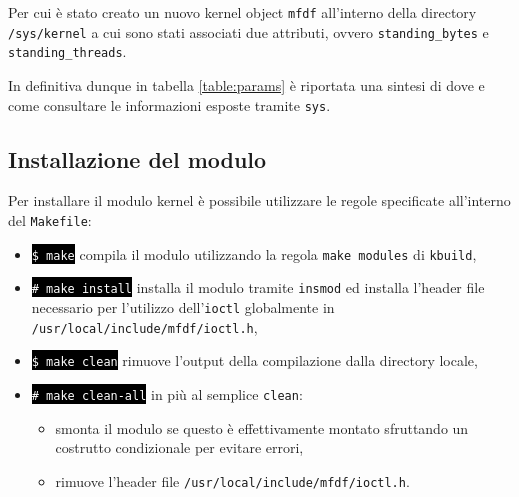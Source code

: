 \documentclass{article}
\newcommand{\terminal}[1]{\colorbox{black}{\textcolor{white}{\texttt{#1}}}}
\begin{document}
Per cui è stato creato un nuovo kernel object \texttt{mfdf} all'interno della directory \texttt{/sys/kernel} a cui sono stati associati due attributi, ovvero \texttt{standing\_bytes} e \texttt{standing\_threads}.

In definitiva dunque in tabella \ref{table:params} è riportata una sintesi di dove e come consultare le informazioni esposte tramite \texttt{sys}.

\begin{table}[htbp]
        \caption{Informazioni esposte in \texttt{sys}}
        \label{table:params}
\end{table}

\subsection{Installazione del modulo}
Per installare il modulo kernel è possibile utilizzare le regole specificate all'interno del \texttt{Makefile}:
\begin{itemize}
        \item \terminal{\$ make} compila il modulo utilizzando la regola \texttt{make modules} di \texttt{kbuild},
        \item \terminal{\# make install} installa il modulo tramite \texttt{insmod} ed installa l'header file necessario per l'utilizzo dell'\texttt{ioctl} globalmente in \texttt{/usr/local/include/mfdf/ioctl.h},
        \item \terminal{\$ make clean} rimuove l'output della compilazione dalla directory locale,
        \item \terminal{\# make clean-all} in più al semplice \texttt{clean}:
                \begin{itemize}
                        \item smonta il modulo se questo è effettivamente montato sfruttando un costrutto condizionale per evitare errori,
                        \item rimuove l'header file \texttt{/usr/local/include/mfdf/ioctl.h}.
                \end{itemize}
\end{itemize}
\end{document}
